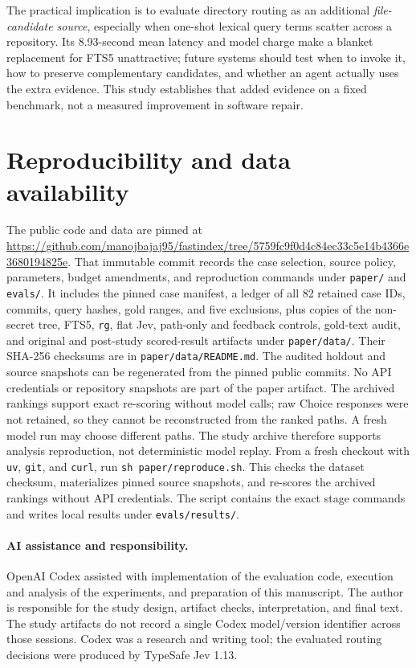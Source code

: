 \documentclass[
]{article}
\begin{document}
The practical implication is to evaluate directory routing as an
additional \emph{file-candidate source}, especially when one-shot
lexical query terms scatter across a repository. Its 8.93-second mean
latency and model charge make a blanket replacement for FTS5
unattractive; future systems should test when to invoke it, how to
preserve complementary candidates, and whether an agent actually uses
the extra evidence. This study establishes that added evidence on a
fixed benchmark, not a measured improvement in software repair.

\section{Reproducibility and data
availability}\label{reproducibility-and-data-availability}

The public code and data are pinned at
\url{https://github.com/manojbajaj95/fastindex/tree/5759fc9f0d4c84ec33c5e14b4366e3680194825e}.
That immutable commit records the case selection, source policy,
parameters, budget amendments, and reproduction commands under
\texttt{paper/} and \texttt{evals/}. It includes the pinned case
manifest, a ledger of all 82 retained case IDs, commits, query hashes,
gold ranges, and five exclusions, plus copies of the non-secret tree,
FTS5, \texttt{rg}, flat Jev, path-only and feedback controls,
gold-text audit, and original and post-study scored-result artifacts
under \texttt{paper/data/}.
Their SHA-256 checksums are in \texttt{paper/data/README.md}.
The audited holdout and source snapshots can be regenerated from the
pinned public commits. No API credentials or repository snapshots are
part of the paper artifact. The archived rankings support exact
re-scoring without model calls; raw Choice responses were not retained,
so they cannot be reconstructed from the ranked paths. A fresh model
run may choose different paths. The study archive therefore supports
analysis reproduction, not deterministic model replay.
From a fresh checkout with \texttt{uv}, \texttt{git}, and \texttt{curl},
run \texttt{sh paper/reproduce.sh}. This checks the dataset checksum,
materializes pinned source snapshots, and re-scores the archived
rankings without API credentials. The script contains the exact stage
commands and writes local results under \texttt{evals/results/}.

\paragraph{AI assistance and responsibility.}
OpenAI Codex assisted with implementation of the evaluation code,
execution and analysis of the experiments, and preparation of this
manuscript. The author is responsible for the study design, artifact
checks, interpretation, and final text. The study artifacts do not
record a single Codex model/version identifier across those sessions.
Codex was a research and writing tool; the evaluated routing decisions
were produced by TypeSafe Jev 1.13.



\end{document}
